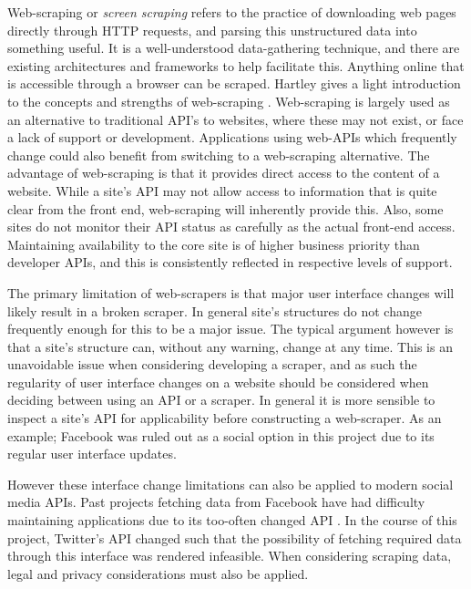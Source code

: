 
Web-scraping or \textit{screen scraping} refers to the practice of downloading web pages directly through HTTP requests, and parsing this unstructured data into something useful. It is a well-understood data-gathering technique, and there are existing architectures and frameworks to help facilitate this.  Anything online that is accessible through a browser can be scraped. Hartley gives a light introduction to the concepts and strengths of web-scraping \cite{no_api_for_me}. Web-scraping is largely used as an alternative to traditional API's to websites, where these may not exist, or face a lack of support or development. Applications using web-APIs which frequently change could also benefit from switching to a web-scraping alternative. The advantage of web-scraping is that it provides direct access to the content of a website. While a site's API may not allow access to information that is quite clear from the front end, web-scraping will inherently provide this. Also, some sites do not monitor their API status 
as carefully as the actual front-end access. Maintaining availability to the core site is of higher business priority than developer APIs, and this is consistently reflected in respective levels of support. 

The primary limitation of web-scrapers is that major user interface changes will likely result in a broken scraper. In general site's structures do not change frequently enough for this to be a major issue. The typical argument however is that a site's structure can, without any warning, change at any time. This is an unavoidable issue when considering developing a scraper, and as such the regularity of user interface changes on a website should be considered when deciding between using an API or a scraper. In general it is more sensible to inspect a site's API for applicability before constructing a web-scraper. As an example; Facebook was ruled out as a social option in this project due to its regular user interface updates. 

However these interface change limitations can also be applied to modern social media APIs. Past projects fetching data from Facebook have had difficulty maintaining applications due to its too-often changed API \cite{kosinski2013private}. In the course of this project, Twitter's API changed such that the possibility of fetching required data through this interface was rendered infeasible. When considering scraping data, legal and privacy considerations must also be applied.

